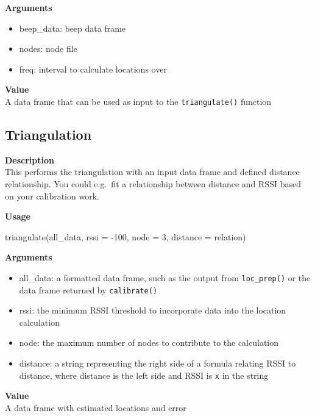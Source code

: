 \documentclass[
]{book}
\newenvironment{Shaded}{\begin{snugshade}}{\end{snugshade}}
\newcommand{\AttributeTok}[1]{\textcolor[rgb]{0.77,0.63,0.00}{#1}}
\newcommand{\DecValTok}[1]{\textcolor[rgb]{0.00,0.00,0.81}{#1}}
\newcommand{\FunctionTok}[1]{\textcolor[rgb]{0.00,0.00,0.00}{#1}}
\newcommand{\NormalTok}[1]{#1}
\newcommand{\SpecialCharTok}[1]{\textcolor[rgb]{0.00,0.00,0.00}{#1}}
\providecommand{\tightlist}{%
  \setlength{\itemsep}{0pt}\setlength{\parskip}{0pt}}
\begin{document}
\textbf{Arguments}

\begin{itemize}
\tightlist
\item
  beep\_data: beep data frame\\
\item
  nodes: node file\\
\item
  freq: interval to calculate locations over
\end{itemize}

\textbf{Value}\\
A data frame that can be used as input to the \texttt{triangulate()} function

\hypertarget{triangulation}{%
\subsection{Triangulation}\label{triangulation}}

\textbf{Description}\\
This performs the triangulation with an input data frame and defined distance relationship. You could e.g.~fit a relationship between distance and RSSI based on your calibration work.

\textbf{Usage}

\begin{Shaded}
\begin{Highlighting}[]
\FunctionTok{triangulate}\NormalTok{(all\_data, }\AttributeTok{rssi =} \SpecialCharTok{{-}}\DecValTok{100}\NormalTok{, }\AttributeTok{node =} \DecValTok{3}\NormalTok{, }\AttributeTok{distance =}\NormalTok{ relation)}
\end{Highlighting}
\end{Shaded}

\textbf{Arguments}

\begin{itemize}
\tightlist
\item
  all\_data: a formatted data frame, such as the output from \texttt{loc\_prep()} or the data frame returned by \texttt{calibrate()}\\
\item
  rssi: the minimum RSSI threshold to incorporate data into the location calculation\\
\item
  node: the maximum number of nodes to contribute to the calculation\\
\item
  distance: a string representing the right side of a formula relating RSSI to distance, where distance is the left side and RSSI is \texttt{x} in the string
\end{itemize}

\textbf{Value}\\
A data frame with estimated locations and error

  
\end{document}
